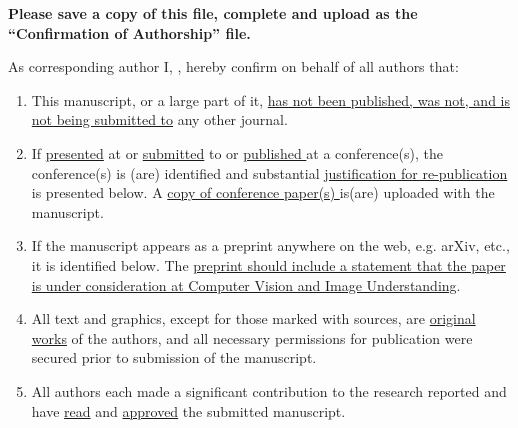 \documentclass[times,twocolumn,final,authoryear]{elsarticle}
\begin{document}
\thispagestyle{empty}
                                                             
\begin{table}[!th]

\begin{minipage}{.9\textwidth}
\baselineskip12pt
\ifpreprint
  \vspace*{1pc}
\else
  \vspace*{-6pc}
\fi

\vskip6pt


\vskip1pc


{\bf Please save a copy of this file, complete and upload as the 
``Confirmation of Authorship'' file.}

\vskip1pc

As corresponding author 
I, \underline{\hphantom{\hspace*{7cm}}}, 
hereby confirm on behalf of all authors that:

\vskip1pc

\begin{enumerate}
\itemsep=3pt
\item This manuscript, or a large part of it, \underline {has not been
published,  was not, and is not being submitted to} any other journal. 

\item If \underline {presented} at or \underline {submitted} to or
\underline  {published }at a conference(s), the conference(s) is (are)
identified and  substantial \underline {justification for
re-publication} is presented  below. A \underline {copy of
conference paper(s) }is(are) uploaded with the  manuscript.

\item If the manuscript appears as a preprint anywhere on the web, e.g.
arXiv,  etc., it is identified below. The \underline {preprint should
include a  statement that the paper is under consideration at Computer Vision and Image Understanding}.

\item All text and graphics, except for those marked with sources, are
\underline  {original works} of the authors, and all necessary
permissions for  publication were secured prior to submission of the
manuscript.

\item All authors each made a significant contribution to the research
reported  and have \underline {read} and \underline {approved} the
submitted  manuscript. 
\end{enumerate}


\end{minipage}
\end{table}
\end{document}
